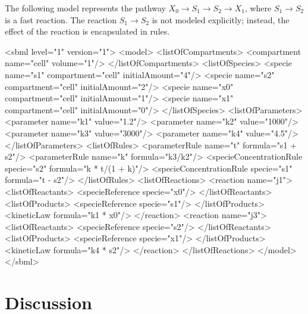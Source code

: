 \documentclass[10pt]{cekarticle}
\begin{document}
The following model represents the pathway $X_0 \to S_1 \to
S_2 \to X_1$, where $S_1 \to S_2$ is a fast reaction.  The
reaction $S_1 \to S_2$ is not modeled explicitly; instead, the
effect of the reaction is encapsulated in rules.

\begin{example}
<sbml level="1" version="1">
    <model>
        <listOfCompartments>
            <compartment name="cell" volume="1"/>
        </listOfCompartments>
        <listOfSpecies>
            <specie name="s1" compartment="cell" initialAmount="4"/>
            <specie name="s2" compartment="cell" initialAmount="2"/>
            <specie name="x0" compartment="cell" initialAmount="1"/>
            <specie name="x1" compartment="cell" initialAmount="0"/>
        </listOfSpecies>
        <listOfParameters>
            <parameter name="k1" value="1.2"/>
            <parameter name="k2" value="1000"/>
            <parameter name="k3" value="3000"/>
            <parameter name="k4" value="4.5"/>
        </listOfParameters>
        <listOfRules>
            <parameterRule name="t" formula="s1 + s2"/>
            <parameterRule name="k" formula="k3/k2"/>
            <specieConcentrationRule specie="s2" formula="k * t/(1 + k)"/>
            <specieConcentrationRule specie="s1" formula="t - s2"/>
        </listOfRules>
        <listOfReactions>
            <reaction name="j1">
                <listOfReactants>
                    <specieReference specie="x0"/>
                </listOfReactants>
                <listOfProducts>
                    <specieReference specie="s1"/>
                </listOfProducts>
                <kineticLaw formula="k1 * x0"/>
            </reaction>
            <reaction name="j3">
                <listOfReactants>
                    <specieReference specie="s2"/>
                </listOfReactants>
                <listOfProducts>
                    <specieReference specie="x1"/>
                </listOfProducts>
                <kineticLaw formula="k4 * s2"/>
            </reaction>
        </listOfReactions>
    </model>
</sbml>
\end{example}


\section{Discussion}
\label{sec:discussion}
\end{document}
